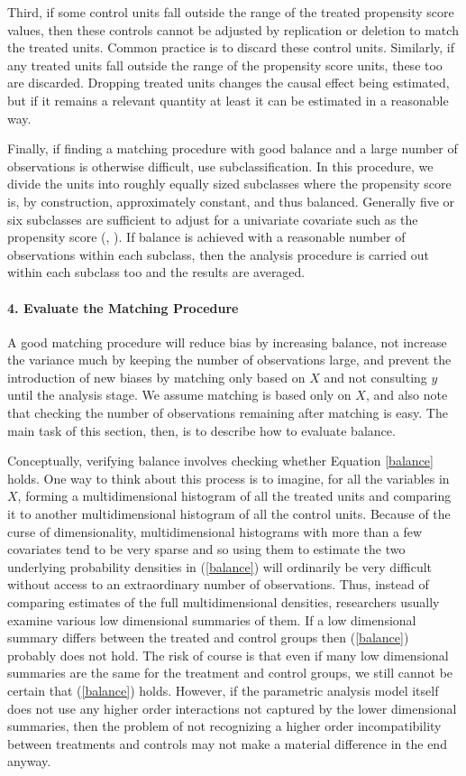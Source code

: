 \documentclass[11pt,titlepage]{article}
\begin{document}
Third, if some control units fall outside the range of the treated
propensity score values, then these controls cannot be adjusted by
replication or deletion to match the treated units.  Common practice
is to discard these control units.  Similarly, if any treated units
fall outside the range of the propensity score units, these too are
discarded.  Dropping treated units changes the causal effect being
estimated, but if it remains a relevant quantity at least it can be
estimated in a reasonable way.

Finally, if finding a matching procedure with good balance and a large
number of observations is otherwise difficult, use subclassification.
In this procedure, we divide the units into roughly equally sized
subclasses where the propensity score is, by construction,
approximately constant, and thus balanced.  Generally five or six
subclasses are sufficient to adjust for a univariate covariate such as
the propensity score (\cite{Cochran68}, \cite{RosRub84}).  If balance
is achieved with a reasonable number of observations within each
subclass, then the analysis procedure is carried out within each
subclass too and the results are averaged.

\paragraph{4. Evaluate the Matching Procedure}
A good matching procedure will reduce bias by increasing balance, not
increase the variance much by keeping the number of observations
large, and prevent the introduction of new biases by matching only
based on $X$ and not consulting $y$ until the analysis stage.  We
assume matching is based only on $X$, and also note that checking the
number of observations remaining after matching is easy.  The main
task of this section, then, is to describe how to evaluate balance.

Conceptually, verifying balance involves checking whether Equation
\ref{balance} holds.  One way to think about this process is to
imagine, for all the variables in $X$, forming a multidimensional
histogram of all the treated units and comparing it to another
multidimensional histogram of all the control units.  Because of the
curse of dimensionality, multidimensional histograms with more than a
few covariates tend to be very sparse and so using them to estimate
the two underlying probability densities in (\ref{balance}) will
ordinarily be very difficult without access to an extraordinary number
of observations.  Thus, instead of comparing estimates of the full
multidimensional densities, researchers usually examine various low
dimensional summaries of them.  If a low dimensional summary differs
between the treated and control groups then (\ref{balance}) probably
does not hold.  The risk of course is that even if many low
dimensional summaries are the same for the treatment and control
groups, we still cannot be certain that (\ref{balance}) holds.
However, if the parametric analysis model itself does not use any
higher order interactions not captured by the lower dimensional
summaries, then the problem of not recognizing a higher order
incompatibility between treatments and controls may not make a
material difference in the end anyway.
\end{document}
